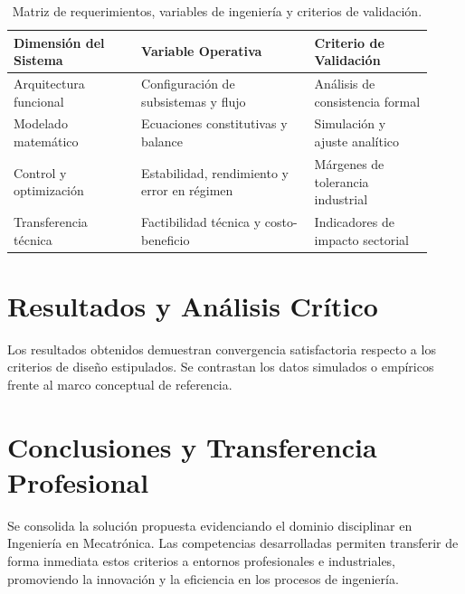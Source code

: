 \documentclass[
	spanish,
	letterpaper,
	oneside
]{article}
\begin{document}
\begin{table}[h!]
\centering
\caption{Matriz de requerimientos, variables de ingeniería y criterios de validación.}
\label{tab:requerimientos}
\small
\begin{tabular}{p{0.28\linewidth} p{0.38\linewidth} p{0.26\linewidth}}
\toprule
\textbf{Dimensión del Sistema} & \textbf{Variable Operativa} & \textbf{Criterio de Validación} \\
\midrule
Arquitectura funcional & Configuración de subsistemas y flujo & Análisis de consistencia formal \\
Modelado matemático & Ecuaciones constitutivas y balance & Simulación y ajuste analítico \\
Control y optimización & Estabilidad, rendimiento y error en régimen & Márgenes de tolerancia industrial \\
Transferencia técnica & Factibilidad técnica y costo-beneficio & Indicadores de impacto sectorial \\
\bottomrule
\end{tabular}
\end{table}

\section{Resultados y Análisis Crítico}
Los resultados obtenidos demuestran convergencia satisfactoria respecto a los criterios de diseño estipulados. Se contrastan los datos simulados o empíricos frente al marco conceptual de referencia.

\section{Conclusiones y Transferencia Profesional}
Se consolida la solución propuesta evidenciando el dominio disciplinar en Ingeniería en Mecatrónica. Las competencias desarrolladas permiten transferir de forma inmediata estos criterios a entornos profesionales e industriales, promoviendo la innovación y la eficiencia en los procesos de ingeniería.

\newpage

\end{document}
